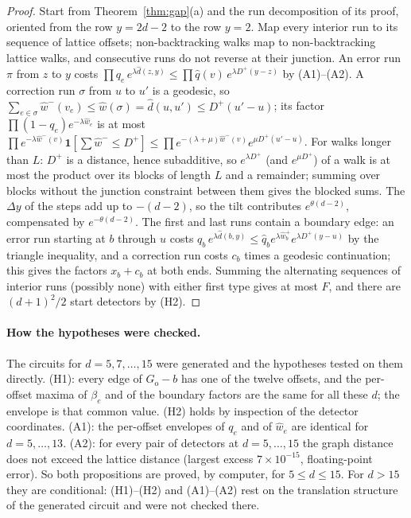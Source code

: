 \documentclass[11pt]{article}
\theoremstyle{plain}
\theoremstyle{definition}
\theoremstyle{remark}
\newcommand{\Go}{G_{\mathrm{o}}}
\newcommand{\hw}{\hat w}
\newcommand{\hd}{\hat d}
\newcommand{\one}{\mathbf 1}
\renewcommand{\_}{\oldunderscore\allowbreak}
\begin{document}
\begin{proof}
Start from Theorem~\ref{thm:gap}(a) and the run decomposition of its proof, oriented from the row $y=2d-2$ to the row $y=2$. Map every interior run to its sequence of lattice offsets; non-backtracking walks map to non-backtracking lattice walks, and consecutive runs do not reverse at their junction. An error run $\pi$ from $z$ to $y$ costs $\prod q_e\,e^{\lambda\hd(z,y)}\le\prod\hat q(v)\,e^{\lambda D^+(y-z)}$ by (A1)--(A2). A correction run $\sigma$ from $u$ to $u'$ is a geodesic, so $\sum_{e\in\sigma}\hat w^-(v_e)\le\hw(\sigma)=\hd(u,u')\le D^+(u'-u)$; its factor $\prod(1-q_e)e^{-\lambda\hw_e}$ is at most $\prod e^{-\lambda\hat w^-(v)}\one[\sum\hat w^-\le D^+]\le\prod e^{-(\lambda+\mu)\hat w^-(v)}e^{\mu D^+(u'-u)}$. For walks longer than $L$: $D^+$ is a distance, hence subadditive, so $e^{\lambda D^+}$ (and $e^{\mu D^+}$) of a walk is at most the product over its blocks of length $L$ and a remainder; summing over blocks without the junction constraint between them gives the blocked sums. The $\Delta y$ of the steps add up to $-(d-2)$, so the tilt contributes $e^{\theta(d-2)}$, compensated by $e^{-\theta(d-2)}$. The first and last runs contain a boundary edge: an error run starting at $b$ through $u$ costs $q_b\,e^{\lambda\hd(b,y)}\le\hat q_be^{\lambda\hat w_b^+}e^{\lambda D^+(y-u)}$ by the triangle inequality, and a correction run costs $c_b$ times a geodesic continuation; this gives the factors $x_b+c_b$ at both ends. Summing the alternating sequences of interior runs (possibly none) with either first type gives at most $F$, and there are $(d+1)^2/2$ start detectors by (H2).
\end{proof}

\paragraph{How the hypotheses were checked.}
The circuits for $d=5,7,\dots,15$ were generated and the hypotheses tested on them directly. (H1): every edge of $\Go-b$ has one of the twelve offsets, and the per-offset maxima of $\beta_e$ and of the boundary factors are the same for all these $d$; the envelope is that common value. (H2) holds by inspection of the detector coordinates. (A1): the per-offset envelopes of $q_e$ and of $\hw_e$ are identical for $d=5,\dots,13$. (A2): for every pair of detectors at $d=5,\dots,15$ the graph distance does not exceed the lattice distance (largest excess $7\times10^{-15}$, floating-point error). So both propositions are proved, by computer, for $5\le d\le15$. For $d>15$ they are conditional: (H1)--(H2) and (A1)--(A2) rest on the translation structure of the generated circuit and were not checked there.
\end{document}
